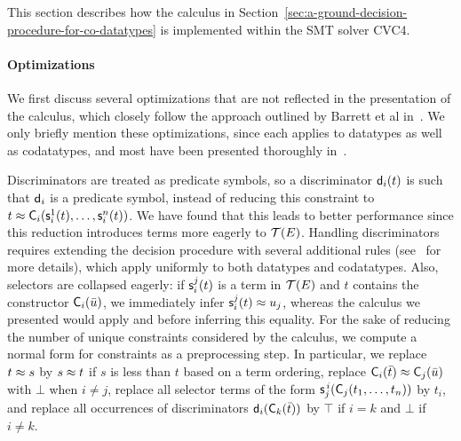 This section describes how the calculus in Section~\ref{sec:a-ground-decision-procedure-for-co-datatypes} is implemented within the SMT solver CVC4.

\paragraph{Optimizations}
We first discuss several optimizations that are not reflected in the presentation of the calculus, which closely follow the approach outlined by Barrett et al in~\cite{}.
We only briefly mention these optimizations, since each applies to datatypes as well as codatatypes, and most have been presented thoroughly in~\cite{}.

Discriminators are treated as predicate symbols, so a discriminator $\textsf{d}_i( t )$ is such that $\textsf{d}_i$
is a predicate symbol, instead of reducing this constraint to $t \approx \textsf{C}_i( \textsf{s}^1_i( t ), \ldots, \textsf{s}^n_i( t ) )$.
We have found that this leads to better performance since this reduction introduces terms more eagerly to $\mathcal{T}(E)$.
Handling discriminators requires extending the decision procedure with several additional rules (see~\cite{} for more details), which apply uniformly to both datatypes and codatatypes.
Also, selectors are collapsed eagerly:
if $\textsf{s}^j_i( t )$ is a term in $\mathcal{T}(E)$ and $t$ contains the constructor
$\textsf{C}_i( \bar u )$, we immediately infer $\textsf{s}^j_i( t ) \approx u_j$, whereas the calculus we presented would apply  and  before inferring this equality.
For the sake of reducing the number of unique constraints considered by the calculus, we compute a normal form for constraints as a preprocessing step.
In particular, we
replace $t \approx s$ by $s \approx t$ if $s$ is less than $t$ based on a term ordering,
replace $\textsf{C}_i( \bar t ) \approx \textsf{C}_j( \bar u )$ with $\bot$ when $i \neq j$,
replace all selector terms of the form $\textsf{s}^{\,i}_j( \textsf{C}_j(t_1,\ldots,t_n) )$ by $t_i$,
and replace all occurrences of discriminators $\textsf{d}_i( \textsf{C}_k( \bar t ) )$ by $\top$ if $i=k$ and $\bot$ if $i \neq k$.


